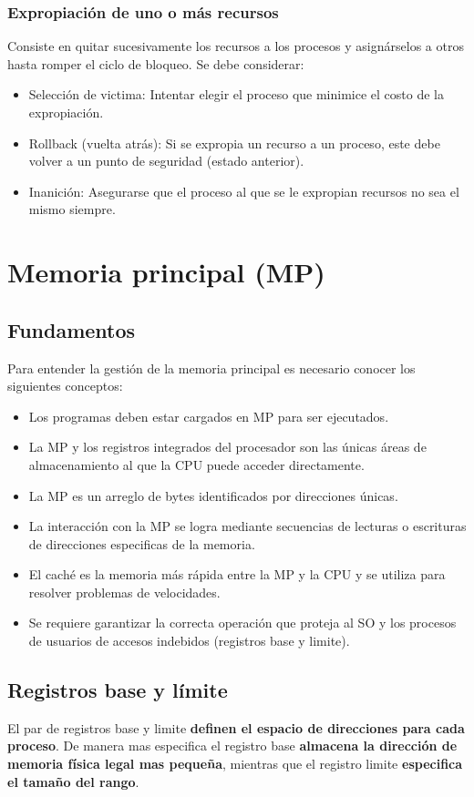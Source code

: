 \documentclass{templateNote}
\begin{document}
\subsubsection*{Expropiación de uno o más recursos}
Consiste en quitar sucesivamente los recursos a los procesos y asignárselos a otros hasta romper el ciclo de bloqueo. Se debe considerar:
\begin{itemize}
    \item Selección de victima: Intentar elegir el proceso que minimice el costo de la expropiación.
    \item Rollback (vuelta atrás): Si se expropia un recurso a un proceso, este debe volver a un punto de seguridad (estado anterior).
    \item Inanición: Asegurarse que el proceso al que se le expropian recursos no sea el mismo siempre.
\end{itemize}

\newpage
\section{Memoria principal (MP)}

\subsection{Fundamentos}
Para entender la gestión de la memoria principal es necesario conocer los siguientes conceptos:
\begin{itemize}
    \item Los programas deben estar cargados en MP para ser ejecutados.
    \item La MP y los registros integrados del procesador son las únicas áreas de almacenamiento al que la CPU puede acceder directamente.
    \item La MP es un arreglo de bytes identificados por direcciones únicas.
    \item La interacción con la MP se logra mediante secuencias de lecturas o escrituras de direcciones especificas de la memoria.
    \item El caché es la memoria más rápida entre la MP y la CPU y se utiliza para resolver problemas de velocidades.
    \item Se requiere garantizar la correcta operación que proteja al SO y los procesos de usuarios de accesos indebidos (registros base y limite). 
\end{itemize}

\subsection{Registros base y límite}
El par de registros base y limite \textbf{definen el espacio de direcciones para cada proceso}. De manera mas especifica el registro base \textbf{almacena la dirección de memoria física legal mas pequeña}, mientras que el registro limite  \textbf{especifica el tamaño del rango}.
\end{document}
